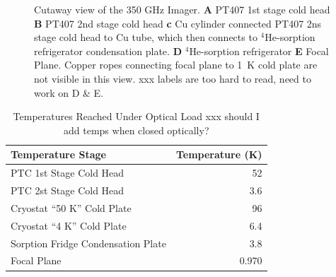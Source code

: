 \documentclass[10pt,twocolumn,article]{memoir}
\newcommand*{\He}[1]{$^{#1}$He\xspace}
\begin{document}
\begin{figure}[t]
\caption{Cutaway view of the 350 GHz Imager. \textbf{A} PT407 1st stage cold head \textbf{B} PT407 2nd stage cold head \textbf{c} Cu cylinder connected PT407 2ns stage cold head to Cu tube, which then connects to \He4-sorption refrigerator condensation plate. \textbf{D} \He4-sorption refrigerator \textbf{E} Focal Plane. Copper ropes connecting focal plane to 1~K cold plate are not visible in this view. xxx labels are too hard to read, need to work on D \& E.}
\label{fig:cryo-cutaway}
\end{figure}

\begin{table}[t]
\centering
\caption{Temperatures Reached Under Optical Load xxx should I add temps when closed optically?}
\label{tab:temp-optical-load}
\begin{tabular}{l r}
\toprule
Temperature Stage &  Temperature (K)\\
\midrule
PTC 1st Stage Cold Head 			& 52 \\
PTC 2st Stage Cold Head 			& 3.6 \\
Cryostat ``50 K'' Cold Plate 		& 96 \\
Cryostat ``4 K'' Cold Plate 			& 6.4 \\
Sorption Fridge Condensation Plate 	& 3.8 \\
Focal Plane 						& 0.970 \\
\bottomrule
\end{tabular}
\end{table}
\end{document}
